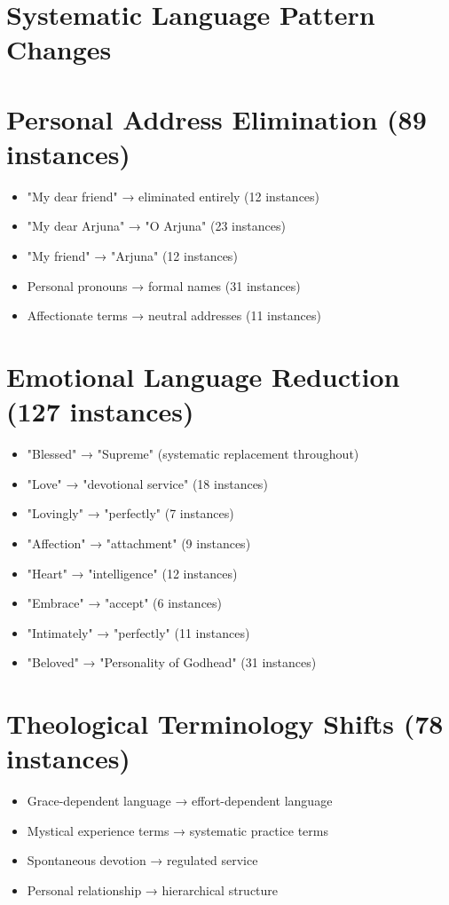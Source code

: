 \documentclass[11pt,twoside]{book}
\begin{document}
\section*{Systematic Language Pattern Changes}
\label{sec:org5263874}

\section*{Personal Address Elimination (89 instances)}
\label{sec:orge51b3d0}
\begin{itemize}
\item "My dear friend" → eliminated entirely (12 instances)
\item "My dear Arjuna" → "O Arjuna" (23 instances)
\item "My friend" → "Arjuna" (12 instances)
\item Personal pronouns → formal names (31 instances)
\item Affectionate terms → neutral addresses (11 instances)
\end{itemize}
\section*{Emotional Language Reduction (127 instances)}
\label{sec:org2276e0c}
\begin{itemize}
\item "Blessed" → "Supreme" (systematic replacement throughout)
\item "Love" → "devotional service" (18 instances)
\item "Lovingly" → "perfectly" (7 instances)
\item "Affection" → "attachment" (9 instances)
\item "Heart" → "intelligence" (12 instances)
\item "Embrace" → "accept" (6 instances)
\item "Intimately" → "perfectly" (11 instances)
\item "Beloved" → "Personality of Godhead" (31 instances)
\end{itemize}
\section*{Theological Terminology Shifts (78 instances)}
\label{sec:orgf25147a}
\begin{itemize}
\item Grace-dependent language → effort-dependent language
\item Mystical experience terms → systematic practice terms
\item Spontaneous devotion → regulated service
\item Personal relationship → hierarchical structure
\end{itemize}
\end{document}
